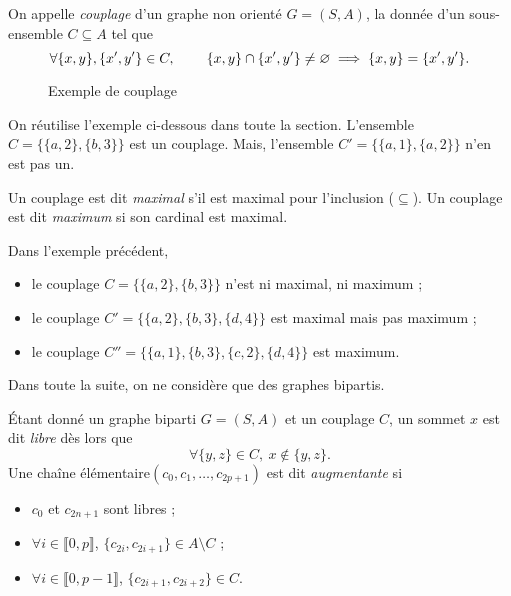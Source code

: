 \begin{defn}[Couplage]
	On appelle \textit{couplage} d'un graphe non orienté $G = (S, A)$, la donnée d'un sous-ensemble $C \subseteq A$\/ tel que \[
		\forall \{x,y\}, \{x',y'\} \in C,\:
		\quad\quad \{x,y\} \cap \{x',y'\} \neq \varnothing
		\implies
		\{x,y\}  = \{x', y'\}
	.\]

\end{defn}

\begin{figure}[H]
	\centering
	\caption{Exemple de couplage}
\end{figure}

\begin{exm}
	On réutilise l'exemple ci-dessous dans toute la section.
	L'ensemble $C = \{\{a,2\}, \{b,3\}\}$\/ est un couplage.
	Mais, l'ensemble $C' = \{\{a,1\}, \{a,2\}\}$\/ n'en est pas un.
\end{exm}

\begin{defn}
	Un couplage est dit \textit{maximal} s'il est maximal pour l'inclusion ($\subseteq$).
	Un couplage est dit \textit{maximum} si son cardinal est maximal.
\end{defn}

\begin{exm}
	Dans l'exemple précédent, 
	\begin{itemize}
		\item le couplage $C = \{\{a,2\}, \{b,3\}\}$\/ n'est ni maximal, ni maximum ;
		\item le couplage $C' = \{\{a,2\}, \{b, 3\}, \{d, 4\}\}$\/ est maximal mais pas maximum ;
		\item le couplage $C'' = \{\{a,1\}, \{b,3\}, \{c,2\}, \{d,4\}\}$\/ est maximum.
	\end{itemize}
\end{exm}

\begin{rmk}
	Dans toute la suite, on ne considère que des graphes bipartis.
\end{rmk}

\begin{defn}
	Étant donné un graphe biparti $G = (S, A)$\/ et un couplage $C$, un sommet $x$\/ est dit \textit{libre} dès lors que \[
		\forall \{y,z\} \in C,\: x \not\in \{y,z\}
	.\]
	Une chaîne élémentaire\footnotemark $(c_0, c_1, \ldots, c_{2p+1})$\/ est dit \textit{augmentante} si
	\begin{itemize}
		\item $c_0$\/ et $c_{2n+1}$\/ sont libres ;
		\item $\forall i \in \llbracket 0,p \rrbracket$, $\{c_{2i}, c_{2i+1}\}\in A \setminus C$ ;
		\item $\forall i \in \llbracket 0,p-1 \rrbracket$, $\{c_{2i+1}, c_{2i+2}\} \in C$.
	\end{itemize}
\end{defn}

